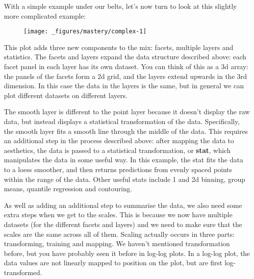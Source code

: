 With a simple example under our belts, let's now turn to look at this
slightly more complicated example:

\begin{Shaded}
\begin{Highlighting}[]
\StringTok{ }
\StringTok{  }\NormalTok{() +}
\StringTok{  }\NormalTok{() +}\StringTok{ }
\StringTok{  }
\end{Highlighting}
\end{Shaded}

\begin{figure}[H]
  \centering
  \texttt{[image: \_figures/mastery/complex-1]}
\end{figure}

This plot adds three new components to the mix: facets, multiple layers
and statistics. The facets and layers expand the data structure
described above: each facet panel in each layer has its own dataset. You
can think of this as a 3d array: the panels of the facets form a 2d
grid, and the layers extend upwards in the 3rd dimension. In this case
the data in the layers is the same, but in general we can plot different
datasets on different layers.

The smooth layer is different to the point layer because it doesn't
display the raw data, but instead displays a statistical transformation
of the data. Specifically, the smooth layer fits a smooth line through
the middle of the data. This requires an additional step in the process
described above: after mapping the data to aesthetics, the data is
passed to a statistical transformation, or \textbf{stat}, which
manipulates the data in some useful way. In this example, the stat fits
the data to a loess smoother, and then returns predictions from evenly
spaced points within the range of the data. Other useful stats include 1
and 2d binning, group means, quantile regression and contouring.

As well as adding an additional step to summarise the data, we also need
some extra steps when we get to the scales. This is because we now have
multiple datasets (for the different facets and layers) and we need to
make sure that the scales are the same across all of them. Scaling
actually occurs in three parts: transforming, training and mapping. We
haven't mentioned transformation before, but you have probably seen it
before in log-log plots. In a log-log plot, the data values are not
linearly mapped to position on the plot, but are first log-transformed.

